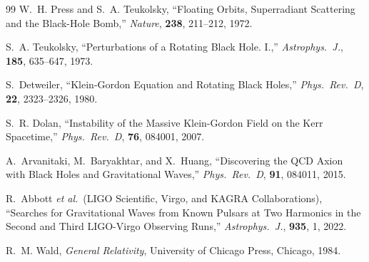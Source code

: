 \documentclass[12pt]{article}
\begin{document}
\begin{thebibliography}{99}
W.~H. Press and S.~A. Teukolsky,
``Floating Orbits, Superradiant Scattering and the Black-Hole Bomb,''
\textit{Nature}, \textbf{238}, 211--212, 1972.

S.~A. Teukolsky,
``Perturbations of a Rotating Black Hole. I.,''
\textit{Astrophys.\ J.}, \textbf{185}, 635--647, 1973.

S.~Detweiler,
``Klein-Gordon Equation and Rotating Black Holes,''
\textit{Phys.\ Rev.\ D}, \textbf{22}, 2323--2326, 1980.

S.~R. Dolan,
``Instability of the Massive Klein-Gordon Field on the Kerr Spacetime,''
\textit{Phys.\ Rev.\ D}, \textbf{76}, 084001, 2007.

A.~Arvanitaki, M.~Baryakhtar, and X.~Huang,
``Discovering the QCD Axion with Black Holes and Gravitational Waves,''
\textit{Phys.\ Rev.\ D}, \textbf{91}, 084011, 2015.

R.~Abbott \textit{et al.}\ (LIGO Scientific, Virgo, and KAGRA
Collaborations),
``Searches for Gravitational Waves from Known Pulsars at Two Harmonics
in the Second and Third LIGO-Virgo Observing Runs,''
\textit{Astrophys.\ J.}, \textbf{935}, 1, 2022.

R.~M. Wald,
\textit{General Relativity},
University of Chicago Press, Chicago, 1984.

\end{thebibliography}
\end{document}
